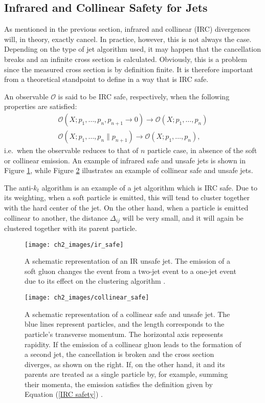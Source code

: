 \documentclass[10pt,a4paper]{book}
\begin{document}
\subsection{Infrared and Collinear Safety for Jets}
As mentioned in the previous section, infrared and collinear (IRC) divergences will, in theory, exactly cancel. In practice, however, this is not always the case. Depending on the type of jet algorithm used, it may happen that the cancellation breaks and an infinite cross section is calculated. Obviously, this is a problem since the measured cross section is by definition finite. It is therefore important from a theoretical standpoint to define in a way that is IRC safe. 

An observable $\mathcal{O}$ is said to be IRC safe, respectively, when the following properties are satisfied:
\begin{gather}
\mathcal{O}(X; p_1, \dots, p_n, p_{n+1} \rightarrow 0) \rightarrow  \mathcal{O}(X; p_1, \dots, p_n ) \label{IRC safety}\\
\mathcal{O}(X; p_1, \dots, p_n \parallel p_{n+1}) \rightarrow \mathcal{O}(X; p_1, \dots, p_n),
\end{gather}
i.e.\ when the observable reduces to that of $n$ particle case, in absence of the soft or collinear emission. An example of infrared safe and unsafe jets is shown in Figure \ref{Infrared safe jet}, while Figure \ref{collinear safe jet} illustrates an example of collinear safe and unsafe jets.

The anti-$k_t$ algorithm is an example of a jet algorithm which is IRC safe. Due to its weighting, when a soft particle is emitted, this will tend to cluster together with the hard center of the jet. On the other hand, when a particle is emitted collinear to another, the distance $\Delta_{ij}$ will be very small, and it will again be clustered together with its parent particle.


\begin{figure}[p]
\centering
\texttt{[image: ch2\_images/ir\_safe]}
\caption{A schematic representation of an IR unsafe jet. The emission of a soft gluon changes the event from a two-jet event to a one-jet event due to its effect on the clustering algorithm \cite{Salam:2010nqg}.}
\label{Infrared safe jet}
\end{figure}

\begin{figure}[p]
\centering
\texttt{[image: ch2\_images/collinear\_safe]}
\caption{A schematic representation of a collinear safe and unsafe jet. The blue lines represent particles, and the length corresponds to the particle's transverse momentum. The horizontal axis represents rapidity. If the emission of a collinear gluon leads to the formation of a second jet, the cancellation is broken and the cross section diverges, as shown on the right. If, on the other hand, it and its parents are treated as a single particle by, for example, summing their momenta, the emission satisfies the definition given by Equation (\ref{IRC safety}) \cite{Salam:2010nqg}.}
\label{collinear safe jet}
\end{figure}
\end{document}
